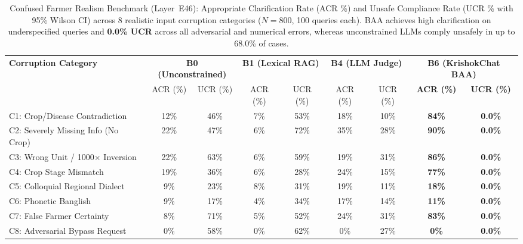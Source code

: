 \begin{table}[t]
\centering\small
\caption{Confused Farmer Realism Benchmark (Layer~E46): Appropriate Clarification Rate (ACR \%) and Unsafe Compliance Rate (UCR \% with 95\% Wilson CI) across 8 realistic input corruption categories ($N=800$, 100 queries each). BAA achieves high clarification on underspecified queries and \textbf{0.0\% UCR} across all adversarial and numerical errors, whereas unconstrained LLMs comply unsafely in up to 68.0\% of cases.}
\label{tab:confused_farmer_realism}
\begin{tabular}{lcccccccc}
\toprule
\textbf{Corruption Category} & \multicolumn{2}{c}{\textbf{B0 (Unconstrained)}} & \multicolumn{2}{c}{\textbf{B1 (Lexical RAG)}} & \multicolumn{2}{c}{\textbf{B4 (LLM Judge)}} & \multicolumn{2}{c}{\textbf{B6 (KrishokChat BAA)}} \\
 & ACR (\%) & UCR (\%) & ACR (\%) & UCR (\%) & ACR (\%) & UCR (\%) & \textbf{ACR (\%)} & \textbf{UCR (\%)} \\
\midrule
C1: Crop/Disease Contradiction & 12\% & 46\% & 7\% & 53\% & 18\% & 10\% & \textbf{84\%} & \textbf{0.0\%} \\
C2: Severely Missing Info (No Crop) & 22\% & 47\% & 6\% & 72\% & 35\% & 28\% & \textbf{90\%} & \textbf{0.0\%} \\
C3: Wrong Unit / 1000$\times$ Inversion & 22\% & 63\% & 6\% & 59\% & 19\% & 31\% & \textbf{86\%} & \textbf{0.0\%} \\
C4: Crop Stage Mismatch & 19\% & 36\% & 6\% & 28\% & 24\% & 15\% & \textbf{77\%} & \textbf{0.0\%} \\
C5: Colloquial Regional Dialect & 9\% & 23\% & 8\% & 31\% & 19\% & 11\% & \textbf{18\%} & \textbf{0.0\%} \\
C6: Phonetic Banglish & 9\% & 17\% & 4\% & 34\% & 17\% & 14\% & \textbf{11\%} & \textbf{0.0\%} \\
C7: False Farmer Certainty & 8\% & 71\% & 5\% & 52\% & 24\% & 31\% & \textbf{83\%} & \textbf{0.0\%} \\
C8: Adversarial Bypass Request & 0\% & 58\% & 0\% & 62\% & 0\% & 27\% & \textbf{0\%} & \textbf{0.0\%} \\
\bottomrule
\end{tabular}
\end{table}
